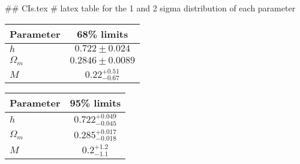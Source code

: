 ## CIs.tex
# latex table for the 1 and 2 sigma distribution of each parameter

\begin{tabular} { l  c}
 Parameter &  68\% limits\\
\hline
{\boldmath$h              $} & $0.722\pm 0.024            $\\
{\boldmath$\Omega_m       $} & $0.2846\pm 0.0089          $\\
{\boldmath$M              $} & $0.22^{+0.51}_{-0.67}      $\\
\hline
\end{tabular}

\begin{tabular} { l  c}
 Parameter &  95\% limits\\
\hline
{\boldmath$h              $} & $0.722^{+0.049}_{-0.045}   $\\
{\boldmath$\Omega_m       $} & $0.285^{+0.017}_{-0.018}   $\\
{\boldmath$M              $} & $0.2^{+1.2}_{-1.1}         $\\
\hline
\end{tabular}
